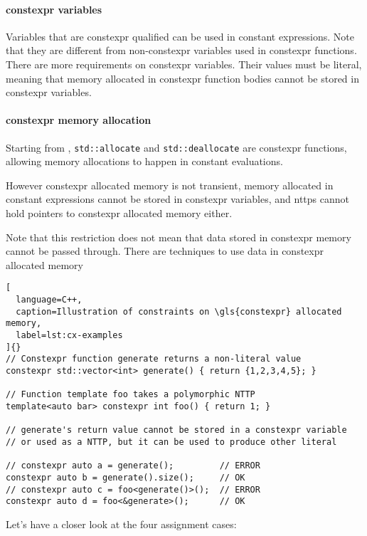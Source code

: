 \documentclass[../main]{subfiles}
\begin{document}
\paragraph{\gls{constexpr} variables} Variables that are \gls{constexpr} qualified can be
used in constant expressions. Note that they are different from
non-\gls{constexpr} variables used in \gls{constexpr} functions.
There are more requirements on \gls{constexpr} variables.
Their values must be literal, meaning that memory allocated in \gls{constexpr}
function bodies cannot be stored in \gls{constexpr} variables.

\paragraph{
  \gls{constexpr} memory allocation
}
Starting from , \lstinline{std::allocate} and \lstinline{std::deallocate}
are \gls{constexpr} functions, allowing memory allocations to happen in
constant evaluations.

However \gls{constexpr} allocated memory is not transient, \ie memory allocated in
constant expressions cannot be stored in \gls{constexpr} variables, and \glspl{nttp}
cannot hold pointers to \gls{constexpr} allocated memory either.

Note that this restriction does not mean that data stored in \gls{constexpr} memory
cannot be passed through. There are techniques to use data in \gls{constexpr}
allocated memory

\begin{lstlisting}[
  language=C++,
  caption=Illustration of constraints on \gls{constexpr} allocated memory,
  label=lst:cx-examples
]{}
// Constexpr function generate returns a non-literal value
constexpr std::vector<int> generate() { return {1,2,3,4,5}; }

// Function template foo takes a polymorphic NTTP
template<auto bar> constexpr int foo() { return 1; }

// generate's return value cannot be stored in a constexpr variable
// or used as a NTTP, but it can be used to produce other literal

// constexpr auto a = generate();         // ERROR
constexpr auto b = generate().size();     // OK
// constexpr auto c = foo<generate()>();  // ERROR
constexpr auto d = foo<&generate>();      // OK
\end{lstlisting}

Let's have a closer look at the four assignment cases:
\end{document}
